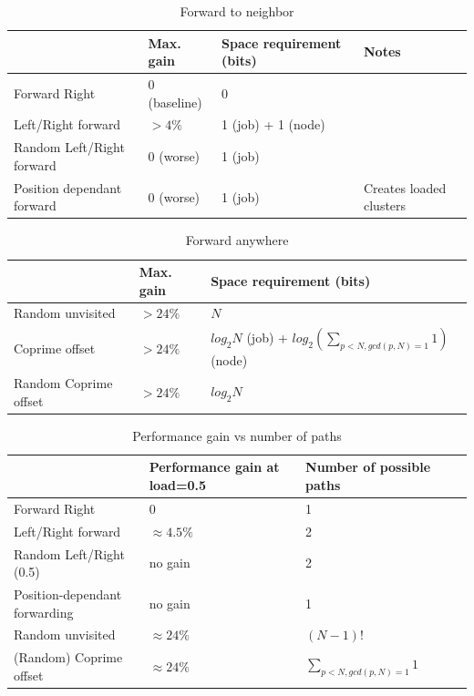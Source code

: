 \documentclass[10pt,a4paper]{article}
\begin{document}
\begin{table}[h!]
\centering
\begin{tabular}{|p{}|p{}|p{}|p{}|} \hline
							& Max. gain		& Space requirement (bits)	& Notes \\ \hline
Forward Right				& 0 (baseline)	& 0							&		\\ \hline
Left/Right forward			& $> 4\%$		& 1 (job) + 1 (node)		&		\\ \hline
Random Left/Right forward	& 0 (worse)		& 1 (job)					&		\\ \hline
Position dependant forward	& 0 (worse)		& 1 (job)					& Creates loaded clusters \\ \hline
\end{tabular}
\caption{Forward to neighbor}
\end{table}

\begin{table}[h!]
\centering
\begin{tabular}{|p{}|p{}|p{}|} \hline
							& Max. gain		& Space requirement (bits)	\\ \hline
Random unvisited			& $> 24\%$		& $N$						\\ \hline
Coprime offset				& $> 24\%$		& $log_2 N$ (job) + $log_2 (\sum_{p < N,gcd(p, N) = 1} 1)$ (node) \\ \hline
Random Coprime offset		& $> 24\%$		& $log_2 N$					\\ \hline
\end{tabular}
\caption{Forward anywhere}
\end{table}


\begin{table}
\centering
\begin{tabular}{|p{}|p{}|p{}|p{}|} \hline
 							& Performance gain at load=0.5	& Number of possible paths	\\ \hline
Forward Right				& 0								& 1							\\ \hline
Left/Right forward			& $\approx 4.5\%$				& 2							\\ \hline
Random Left/Right (0.5)		& no gain						& 2							\\ \hline
Position-dependant forwarding & no gain						& 1							\\ \hline
Random unvisited			& $\approx 24\%$						& $(N-1)!$					\\ \hline
(Random) Coprime offset		& $\approx 24\%$						& $\sum_{p < N,gcd(p, N) = 1} 1$ \\ \hline
\end{tabular}
\caption{Performance gain vs number of paths}
\end{table}
\end{document}
